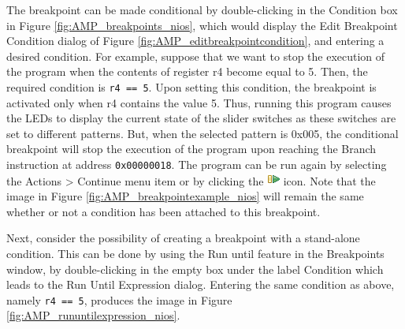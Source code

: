 \documentclass[11pt, twoside, pdftex]{article}
\begin{document}
The breakpoint can be made conditional by double-clicking in
the {\sf Condition} box in Figure \ref{fig:AMP_breakpoints_nios}, which would display the
Edit Breakpoint Condition dialog of Figure \ref{fig:AMP_editbreakpointcondition}, and entering a
desired condition. For example, suppose that we want to stop the
execution of the program when the contents of register r4
become equal to 5. Then, the required condition is
\texttt{r4 == 5}. Upon setting this condition, the breakpoint
is activated only when r4 contains the value 5.
Thus, running this program causes the 
LEDs to display the current state of the slider switches as these
switches are set to different patterns. But, when the selected
pattern is 0x005, the conditional breakpoint will stop the
execution of the program upon reaching the Branch instruction
at address \texttt{0x00000018}. 
The program can be run again by selecting the 
\textsf{Actions > Continue} menu item or by clicking the \includegraphics{toolbar/continue.png} icon.  
Note that the image in Figure \ref{fig:AMP_breakpointexample_nios} will remain the same whether
or not a condition has been attached to this breakpoint.

\newpage 
Next, consider the possibility of creating a breakpoint with a
stand-alone condition. This can be done by using the 
{\sf Run until} feature in the Breakpoints window, by
double-clicking in the empty box under the label {\sf Condition}
which leads to the {\sf Run Until Expression} dialog.
Entering the same condition as above, namely \texttt{r4 == 5},
produces the image in Figure \ref{fig:AMP_rununtilexpression_nios}.
\end{document}
